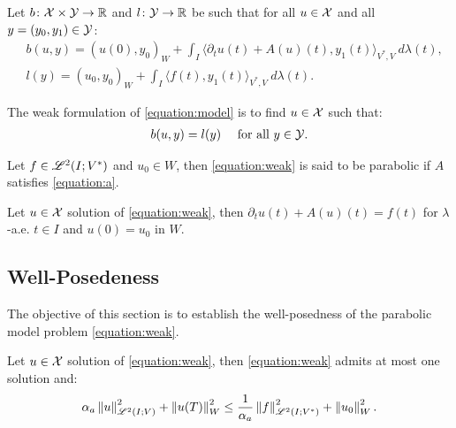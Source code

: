 \begin{definition}[$b$ and $l$]
    Let $b \colon \mathcal{X} \times \mathcal{Y} \rightarrow \mathbb{R}$ and $l \colon \mathcal{Y} \rightarrow \mathbb{R}$ be such that for all $u \in \mathcal{X}$ and all $y = (y_0, y_1) \in \mathcal{Y}$:
    \begin{align}
        & b(u, y) = \left( u(0), y_0 \right)_W + \int_I \langle \partial_t u(t) + A(u)(t), y_1(t) \rangle_{V^*, V} ~ d \lambda(t), \\
        & l(y) = \left( u_0, y_0 \right)_W + \int_I \langle f(t), y_1(t) \rangle_{V^*, V} ~ d \lambda(t).
    \end{align}
\end{definition}

\begin{definition}
    The weak formulation of \cref{equation:model} is to find $u \in \mathcal{X}$ such that:
    \begin{align}
        b(u, y) &= l(y) &\text{ for all } y \in \mathcal{Y}. \label{equation:weak}
    \end{align}
\end{definition}

\begin{definition}
    Let $f \in \mathscr{L}^{2}(I; V^*)$ and $u_0 \in W$, then \cref{equation:weak} is said to be parabolic if $A$ satisfies \cref{equation:a}.
\end{definition}

\begin{lemma}
    Let $u \in \mathcal{X}$ solution of \cref{equation:weak}, then $\partial_t u(t) + A(u)(t) = f(t)$ for $\lambda$-a.e. $t \in I$ and $u(0) = u_0$ in $W$.
\end{lemma}

\subsection{Well-Posedeness} \label{subsection:well_posedeness}

The objective of this section is to establish the well-posedness of the parabolic model problem \cref{equation:weak}.

\begin{lemma}
    Let $u \in \mathcal{X}$ solution of \cref{equation:weak}, then \cref{equation:weak} admits at most one solution and:
    \begin{align}
        \alpha_{a} \left\lVert u \right\rVert_{\mathscr{L}^{2}(I; V)}^2 + \left\lVert u(T) \right\rVert_W^2 \leq \frac{1}{\alpha_{a}} \left\lVert f \right\rVert_{\mathscr{L}^{2}(I; V^*)}^2 + \left\lVert u_0 \right\rVert_W^2.
    \end{align}
\end{lemma}

